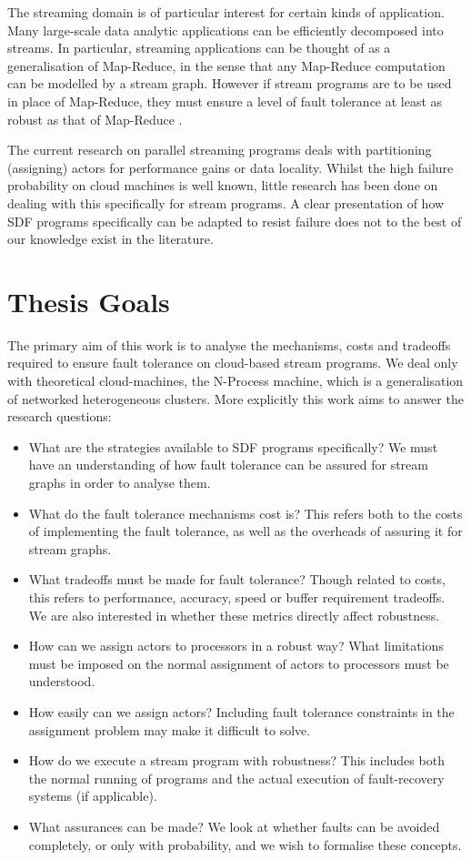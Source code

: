 The streaming domain is of particular interest for certain kinds of application.
Many large-scale data analytic applications can be efficiently decomposed into streams.
In particular, streaming applications can be thought of as a generalisation of Map-Reduce, in the sense that any Map-Reduce computation can be modelled by a stream graph.
However if stream programs are to be used in place of Map-Reduce, they must ensure a level of fault tolerance at least as robust as that of Map-Reduce \cite{dea08}.

The current research on parallel streaming programs deals with partitioning (assigning) actors for performance gains or data locality.
Whilst the high failure probability on cloud machines is well known, little research has been done on dealing with this specifically for stream programs.
A clear presentation of how SDF programs specifically can be adapted to resist failure does not to the best of our knowledge exist in the literature.

\section{Thesis Goals}
\label{secInGoal}

The primary aim of this work is to analyse the mechanisms, costs and tradeoffs required to ensure fault tolerance on cloud-based stream programs.
We deal only with theoretical cloud-machines, the N-Process machine, which is a generalisation of networked heterogeneous clusters.
More explicitly this work aims to answer the research questions:

\begin{itemize}
	\item What are the strategies available to SDF programs specifically?
			We must have an understanding of how fault tolerance can be assured for stream graphs in order to analyse them.
	\item What do the fault tolerance mechanisms cost is?
			This refers both to the costs of implementing the fault tolerance, as well as the overheads of assuring it for stream graphs.
	\item What tradeoffs must be made for fault tolerance?
			Though related to costs, this refers to performance, accuracy, speed or buffer requirement tradeoffs.
			We are also interested in whether these metrics directly affect robustness.
	\item How can we assign actors to processors in a robust way?
			What limitations must be imposed on the normal assignment of actors to processors must be understood.
	\item How easily can we assign actors?
			Including fault tolerance constraints in the assignment problem may make it difficult to solve.
	\item How do we execute a stream program with robustness?
			This includes both the normal running of programs and the actual execution of fault-recovery systems (if applicable).
	\item What assurances can be made?
			We look at whether faults can be avoided completely, or only with probability, and we wish to formalise these concepts.
\end{itemize}

